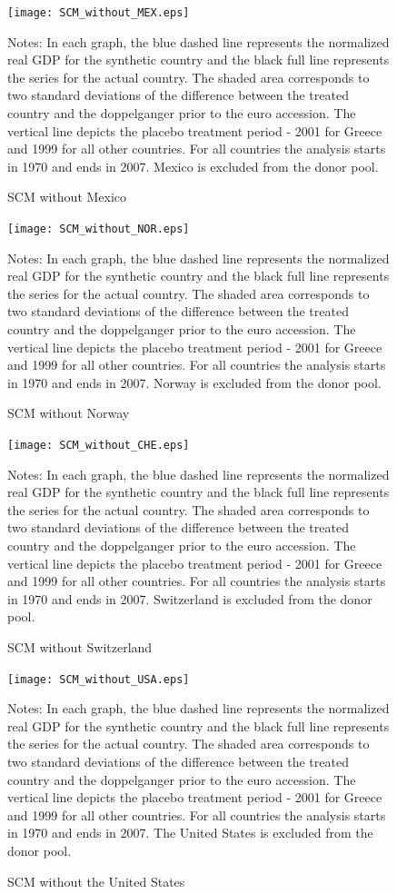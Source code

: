 \documentclass[12pt]{article}
\newcommand{\annote}[1]{\parbox{\textwidth}{\renewcommand{\baselinestretch}{1.0}\vspace{12pt} \small Notes: #1}}
\begin{document}
\begin{appendices}
\begin{figure}[h!]
    \centering
    \label{F_MEX}
    \caption{SCM without Mexico}
    \texttt{[image: SCM\_without\_MEX.eps]}
         \annote{In each graph, the blue dashed line represents the normalized real GDP for the synthetic country and the black full line represents the series for the actual country. The shaded area corresponds to two standard deviations of the difference between the treated country and the doppelganger prior to the euro accession. The vertical line depicts the placebo treatment period - 2001 for Greece and 1999 for all other countries. For all countries the analysis starts in 1970 and ends in 2007. Mexico is excluded from the donor pool. }
\end{figure}

\begin{figure}[h!]
    \centering
    \label{F_NOR}
    \caption{SCM without Norway}
    \texttt{[image: SCM\_without\_NOR.eps]}
         \annote{In each graph, the blue dashed line represents the normalized real GDP for the synthetic country and the black full line represents the series for the actual country. The shaded area corresponds to two standard deviations of the difference between the treated country and the doppelganger prior to the euro accession. The vertical line depicts the placebo treatment period - 2001 for Greece and 1999 for all other countries. For all countries the analysis starts in 1970 and ends in 2007. Norway is excluded from the donor pool. }
\end{figure}

\begin{figure}[h!]
    \centering
    \label{F_CHE}
    \caption{SCM without Switzerland}
    \texttt{[image: SCM\_without\_CHE.eps]}
         \annote{In each graph, the blue dashed line represents the normalized real GDP for the synthetic country and the black full line represents the series for the actual country. The shaded area corresponds to two standard deviations of the difference between the treated country and the doppelganger prior to the euro accession. The vertical line depicts the placebo treatment period - 2001 for Greece and 1999 for all other countries. For all countries the analysis starts in 1970 and ends in 2007. Switzerland is excluded from the donor pool. }
\end{figure}

\begin{figure}[h!]
    \centering
    \label{F_USA}
    \caption{SCM without the United States}
    \texttt{[image: SCM\_without\_USA.eps]}
             \annote{In each graph, the blue dashed line represents the normalized real GDP for the synthetic country and the black full line represents the series for the actual country. The shaded area corresponds to two standard deviations of the difference between the treated country and the doppelganger prior to the euro accession. The vertical line depicts the placebo treatment period - 2001 for Greece and 1999 for all other countries. For all countries the analysis starts in 1970 and ends in 2007. The United States is excluded from the donor pool. }
\end{figure}


\end{appendices}
\end{document}
